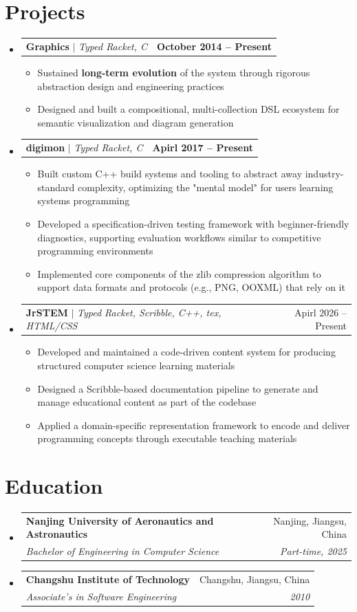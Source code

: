 \documentclass[letterpaper,11pt]{article}
\makeatletter
\newcommand{\resumeItem}[1]{
  \item\small{
    {#1 \vspace{-2pt}}
  }
}
\newcommand{\resumeSubheading}[4]{
  \vspace{-2pt}\item
    \begin{tabular*}{0.97\textwidth}[t]{l@{\extracolsep{\fill}}r}
      \textbf{#1} & #2 \\
      \textit{\small#3} & \textit{\small #4} \\
    \end{tabular*}\vspace{-7pt}
}
\newcommand{\resumeProjectHeading}[2]{
    \item
    \begin{tabular*}{0.97\textwidth}{l@{\extracolsep{\fill}}r}
      \small#1 & #2 \\
    \end{tabular*}\vspace{-7pt}
}
\newcommand{\resumeSubHeadingListStart}{\begin{itemize}[leftmargin=0.15in, label={}]}
\newcommand{\resumeSubHeadingListEnd}{\end{itemize}}
\newcommand{\resumeItemListStart}{\begin{itemize}}
\newcommand{\resumeItemListEnd}{\end{itemize}\vspace{-5pt}}
\makeatother
\begin{document}
\section{Projects}
    \resumeSubHeadingListStart
      \resumeProjectHeading
          {\textbf{Graphics} $|$ \emph{Typed Racket, C}}{\textbf{October 2014 -- Present}}
          \resumeItemListStart
            \resumeItem{Sustained \textbf{long-term evolution} of the system through rigorous abstraction design and engineering practices}
            \resumeItem{Designed and built a compositional, multi-collection DSL ecosystem for semantic visualization and diagram generation}
          \resumeItemListEnd
      \resumeProjectHeading
          {\textbf{digimon} $|$ \emph{Typed Racket, C}}{\textbf{Apirl 2017 -- Present}}
          \resumeItemListStart
            \resumeItem{Built custom C++ build systems and tooling to abstract away industry-standard complexity,
              optimizing the "mental model" for users learning systems programming}
            \resumeItem{Developed a specification-driven testing framework with beginner-friendly diagnostics,
              supporting evaluation workflows similar to competitive programming environments}
            \resumeItem{Implemented core components of the zlib compression algorithm to support data formats and protocols (e.g., PNG, OOXML) that rely on it}
          \resumeItemListEnd
      \resumeProjectHeading
          {\textbf{JrSTEM} $|$ \emph{Typed Racket, Scribble, C++, tex, HTML/CSS}}{Apirl 2026 -- Present}
          \resumeItemListStart
            \resumeItem{Developed and maintained a code-driven content system for producing structured computer science learning materials}
            \resumeItem{Designed a Scribble-based documentation pipeline to generate and manage educational content as part of the codebase}
            \resumeItem{Applied a domain-specific representation framework to encode and deliver programming concepts through executable teaching materials}
          \resumeItemListEnd
    \resumeSubHeadingListEnd

\section{Education}
\resumeSubHeadingListStart
    \resumeSubheading
      {Nanjing University of Aeronautics and Astronautics}{Nanjing, Jiangsu, China}
      {Bachelor of Engineering in Computer Science}{Part-time, 2025}
    \resumeSubheading
      {Changshu Institute of Technology}{Changshu, Jiangsu, China}
      {Associate's in Software Engineering}{2010}
\resumeSubHeadingListEnd
\end{document}
